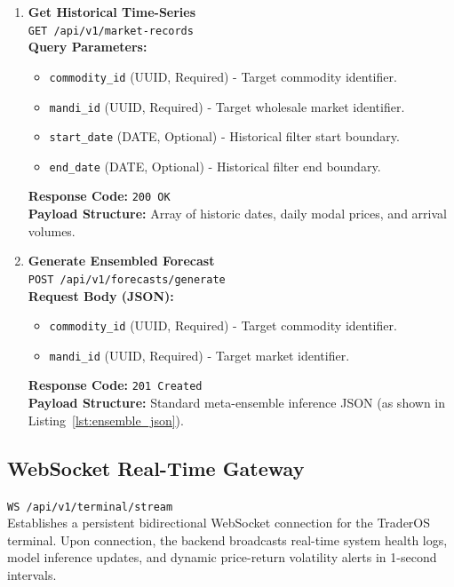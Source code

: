 \documentclass[12pt,a4paper]{report}
\theoremstyle{definition}
\theoremstyle{remark}
\begin{document}
\begin{enumerate}
    \item \textbf{Get Historical Time-Series}\\
    \texttt{GET /api/v1/market-records}\\
    \textbf{Query Parameters:}
    \begin{itemize}
        \item \texttt{commodity\_id} (UUID, Required) - Target commodity identifier.
        \item \texttt{mandi\_id} (UUID, Required) - Target wholesale market identifier.
        \item \texttt{start\_date} (DATE, Optional) - Historical filter start boundary.
        \item \texttt{end\_date} (DATE, Optional) - Historical filter end boundary.
    \end{itemize}
    \textbf{Response Code:} \texttt{200 OK}\\
    \textbf{Payload Structure:} Array of historic dates, daily modal prices, and arrival volumes.

    \item \textbf{Generate Ensembled Forecast}\\
    \texttt{POST /api/v1/forecasts/generate}\\
    \textbf{Request Body (JSON):}
    \begin{itemize}
        \item \texttt{commodity\_id} (UUID, Required) - Target commodity identifier.
        \item \texttt{mandi\_id} (UUID, Required) - Target market identifier.
    \end{itemize}
    \textbf{Response Code:} \texttt{201 Created}\\
    \textbf{Payload Structure:} Standard meta-ensemble inference JSON (as shown in Listing~\ref{lst:ensemble_json}).
\end{enumerate}

\subsection{WebSocket Real-Time Gateway}
\texttt{WS /api/v1/terminal/stream}\\
Establishes a persistent bidirectional WebSocket connection for the TraderOS terminal. Upon connection, the backend broadcasts real-time system health logs, model inference updates, and dynamic price-return volatility alerts in 1-second intervals.
\end{document}
